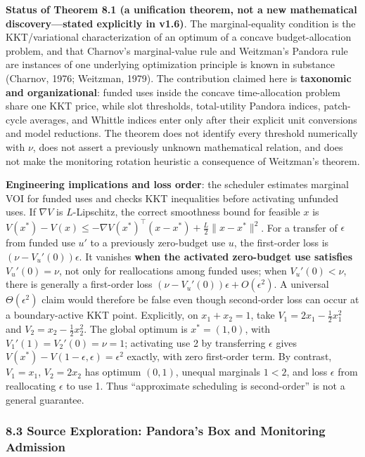 \documentclass[
  11pt]{article}
\begin{document}
\textbf{Status of Theorem 8.1 (a unification theorem, not a new
mathematical discovery---stated explicitly in v1.6)}. The
marginal-equality condition is the KKT/variational characterization of
an optimum of a concave budget-allocation problem, and that Charnov's
marginal-value rule and Weitzman's Pandora rule are instances of one
underlying optimization principle is known in substance (Charnov, 1976;
Weitzman, 1979). The contribution claimed here is \textbf{taxonomic and
organizational}: funded uses inside the concave time-allocation problem
share one KKT price, while slot thresholds, total-utility Pandora
indices, patch-cycle averages, and Whittle indices enter only after
their explicit unit conversions and model reductions. The theorem does
not identify every threshold numerically with \(\nu\), does not assert a
previously unknown mathematical relation, and does not make the
monitoring rotation heuristic a consequence of Weitzman's theorem.

\textbf{Engineering implications and loss order}: the scheduler
estimates marginal VOI for funded uses and checks KKT inequalities
before activating unfunded uses. If \(\nabla V\) is \(L\)-Lipschitz, the
correct smoothness bound for feasible \(x\) is
\(V(x^*)-V(x)\le-\nabla V(x^*)^\top(x-x^*)+\tfrac L2\|x-x^*\|^2\). For a
transfer of \(\epsilon\) from funded use \(u'\) to a previously
zero-budget use \(u\), the first-order loss is
\((\nu-V_u'(0))\epsilon\). It vanishes \textbf{when the activated
zero-budget use satisfies \(V_u'(0)=\nu\)}, not only for reallocations
among funded uses; when \(V_u'(0)<\nu\), there is generally a
first-order loss \((\nu-V_u'(0))\epsilon+O(\epsilon^2)\). A universal
\(\Theta(\epsilon^2)\) claim would therefore be false even though
second-order loss can occur at a boundary-active KKT point. Explicitly,
on \(x_1+x_2=1\), take \(V_1=2x_1-\tfrac12x_1^2\) and
\(V_2=x_2-\tfrac12x_2^2\). The global optimum is \(x^*=(1,0)\), with
\(V_1'(1)=V_2'(0)=\nu=1\); activating use 2 by transferring \(\epsilon\)
gives \(V(x^*)-V(1-\epsilon,\epsilon)=\epsilon^2\) exactly, with zero
first-order term. By contrast, \(V_1=x_1\), \(V_2=2x_2\) has optimum
\((0,1)\), unequal marginals \(1<2\), and loss \(\epsilon\) from
reallocating \(\epsilon\) to use 1. Thus ``approximate scheduling is
second-order'' is not a general guarantee.

\subsubsection{8.3 Source Exploration: Pandora's Box and Monitoring
Admission}\label{source-exploration-pandoras-box-and-monitoring-admission}
\end{document}
